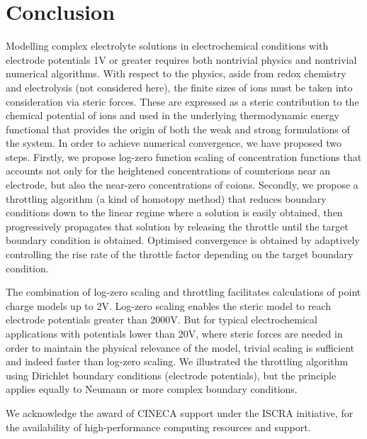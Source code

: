 \section{Conclusion}

Modelling complex electrolyte solutions in electrochemical conditions
with electrode potentials 1V or greater requires both nontrivial
physics and nontrivial numerical algorithms.
With respect to the
physics, aside from redox chemistry and electrolysis (not considered
here), the finite sizes of ions must be taken into consideration via
steric forces. These are expressed as a steric contribution to the
chemical potential of ions and used in the underlying thermodynamic
energy functional that provides the origin of both the weak and strong
formulations of the system.
In order to achieve numerical convergence, we have proposed two
steps. Firstly, we propose log-zero function scaling of
concentration functions that accounts
not only for the heightened concentrations of counterions near an
electrode, but also the near-zero concentrations of coions. Secondly,
we propose a throttling algorithm (a kind of homotopy method) that reduces boundary conditions
down to the linear regime where a solution is easily obtained, then
progressively propagates that solution by releasing the throttle
until the target boundary condition is obtained. Optimised convergence
is obtained by adaptively controlling the rise rate of the throttle factor
depending on the target boundary condition.

The combination of
log-zero scaling and throttling facilitates calculations of point
charge models up to 2V. Log-zero scaling enables
the steric model to reach electrode potentials greater than 2000V.
But for typical electrochemical applications with potentials lower than 20V,
where steric forces are needed in order to maintain the physical relevance
of the model, trivial scaling is sufficient and indeed faster than log-zero scaling.
We illustrated the throttling algorithm using Dirichlet boundary
conditions (electrode potentials), but the  principle applies
equally to Neumann or more complex boundary conditions.

\begin{acknowledgement}
  We acknowledge the award of CINECA support under the ISCRA
  initiative, for the availability of high-performance computing
  resources and support.
\end{acknowledgement}





